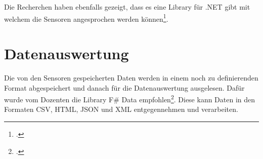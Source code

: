 Die Recherchen haben ebenfalls gezeigt, dass es eine Library für .NET gibt mit welchem die Sensoren angesprochen werden können\footcite{NuGet_GrovePi_2016-04-24}.



\section{Datenauswertung}
Die von den Sensoren gespeicherten Daten werden in einem noch zu definierenden Format abgespeichert und danach für die Datenauswertung ausgelesen. Dafür wurde vom Dozenten die Library F\# Data empfohlen\footcite{Fsharp_Data_2016-04-24}. Diese kann Daten in den Formaten CSV, HTML, JSON und XML entgegennehmen und verarbeiten.

